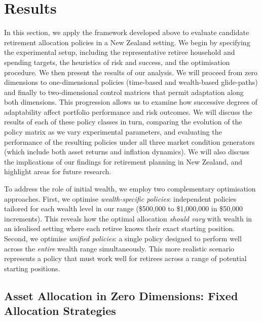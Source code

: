 \documentclass[11pt]{article}
\begin{document}
\section{Results}

In this section, we apply the framework developed above to evaluate candidate retirement allocation policies in a New Zealand setting. We begin by specifying the experimental setup, including the representative retiree household and spending targets, the heuristics of risk and success, and the optimisation procedure. We then present the results of our analysis. We will proceed from zero dimensions to one-dimensional policies (time-based and wealth-based glide-paths) and finally to two-dimensional control matrices that permit adaptation along both dimensions. This progression allows us to examine how successive degrees of adaptability affect portfolio performance and risk outcomes. We will discuss the results of each of these policy classes in turn, comparing the evolution of the policy matrix as we vary experimental parameters, and evaluating the performance of the resulting policies under all three market condition generators (which include both asset returns and inflation dynamics). We will also discuss the implications of our findings for retirement planning in New Zealand, and highlight areas for future research. 

To address the role of initial wealth, we employ two complementary optimisation approaches. First, we optimise \textit{wealth-specific policies}: independent policies tailored for each wealth level in our range (\$500,000 to \$1,000,000 in \$50,000 increments). This reveals how the optimal allocation \textit{should vary} with wealth in an idealised setting where each retiree knows their exact starting position. Second, we optimise \textit{unified policies}: a single policy designed to perform well across the \textit{entire} wealth range simultaneously. This more realistic scenario represents a policy that must work well for retirees across a range of potential starting positions.


\subsection{Asset Allocation in Zero Dimensions: Fixed Allocation Strategies}
\label{sec:fixed_allocation_strategies}
\end{document}
